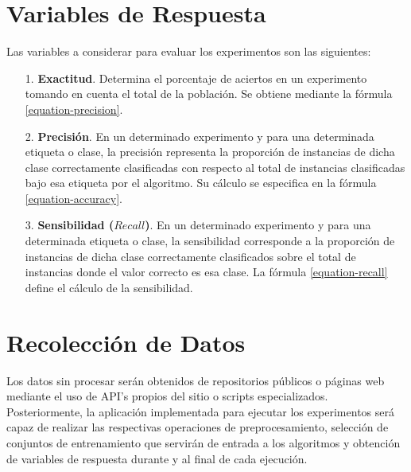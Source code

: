 \section{Variables de Respuesta}
Las variables a considerar para evaluar los experimentos son las siguientes:
\begin{itemize}
\item [1.] \textbf{Exactitud}. Determina el porcentaje de aciertos en un experimento tomando en cuenta el total de la población. Se obtiene mediante la fórmula \ref{equation-precision}.
\item [2.] \textbf{Precisión}. En un determinado experimento y para una determinada etiqueta o clase, la precisión representa la proporción de instancias de dicha clase correctamente clasificadas con respecto al total de instancias clasificadas bajo esa etiqueta por el algoritmo. Su cálculo se especifica en la fórmula \ref{equation-accuracy}.
\item [3.] \textbf{Sensibilidad ($Recall$)}. En un determinado experimento y para una determinada etiqueta o clase, la sensibilidad corresponde a la proporción de instancias de dicha clase correctamente clasificados sobre el total de instancias donde el valor correcto es esa clase. La fórmula \ref{equation-recall} define el cálculo de la sensibilidad.
\end{itemize}

\section{Recolección de Datos}
 Los datos sin procesar serán obtenidos de repositorios públicos o páginas web mediante el uso de API’s propios del sitio o scripts especializados. Posteriormente, la aplicación implementada para ejecutar los experimentos será capaz de realizar las respectivas operaciones de preprocesamiento, selección de conjuntos de entrenamiento que servirán de entrada a los algoritmos y obtención de variables de respuesta durante y al final de cada ejecución. 


